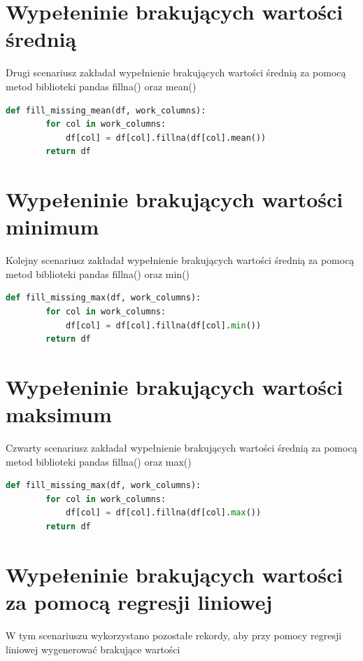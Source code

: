 \documentclass{book}
\begin{document}
\section{Wypełeninie brakujących wartości średnią}
Drugi scenariusz zakładał wypełnienie brakujących 
wartości średnią za pomocą metod biblioteki pandas 
fillna() oraz mean()

\begin{lstlisting}[language=Python, caption={Wypełnienie 
    brakujących wartości średnią}, captionpos=b]
    def fill_missing_mean(df, work_columns):
        for col in work_columns:
            df[col] = df[col].fillna(df[col].mean())
        return df
\end{lstlisting}

\section{Wypełeninie brakujących wartości minimum}
Kolejny scenariusz zakładał wypełnienie brakujących 
wartości średnią za pomocą metod biblioteki pandas fillna() 
oraz min()

\begin{lstlisting}[language=Python, caption={Wypełnienie 
    brakujących wartości minimum}, captionpos=b]
    def fill_missing_max(df, work_columns):
        for col in work_columns:
            df[col] = df[col].fillna(df[col].min())
        return df
\end{lstlisting}

\section{Wypełeninie brakujących wartości maksimum}
Czwarty scenariusz zakładał wypełnienie brakujących 
wartości średnią za pomocą metod biblioteki pandas 
fillna() oraz max()

\begin{lstlisting}[language=Python, caption={Wypełnienie 
    brakujących wartości maksimum}, captionpos=b]
    def fill_missing_max(df, work_columns):
        for col in work_columns:
            df[col] = df[col].fillna(df[col].max())
        return df
\end{lstlisting}

\section{Wypełeninie brakujących wartości za pomocą regresji liniowej}
W tym scenariuszu wykorzystano pozostałe rekordy, 
aby przy pomocy regresji liniowej wygenerować 
brakujące wartości
\end{document}
